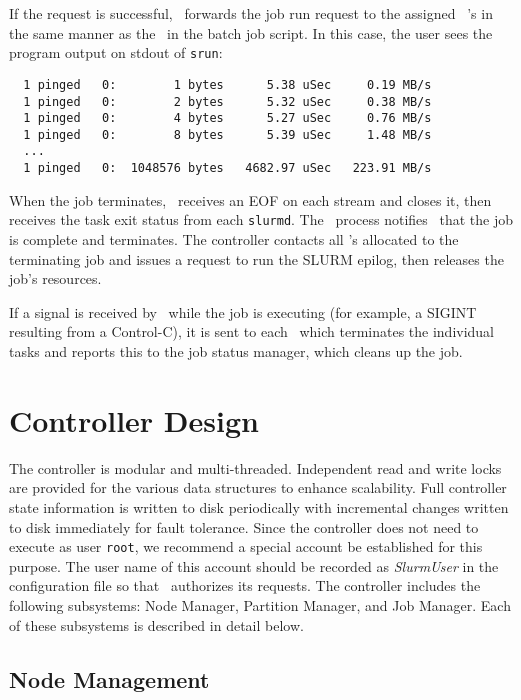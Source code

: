 If the request is successful, \srun\ forwards the job run request
to the assigned \slurmd~'s in the same manner as the \srun\ in the
batch job script. In this case, the user sees the program output on 
stdout of {\tt srun}:

\begin{verbatim}
  1 pinged   0:        1 bytes      5.38 uSec     0.19 MB/s                     
  1 pinged   0:        2 bytes      5.32 uSec     0.38 MB/s                     
  1 pinged   0:        4 bytes      5.27 uSec     0.76 MB/s                     
  1 pinged   0:        8 bytes      5.39 uSec     1.48 MB/s                     
  ...
  1 pinged   0:  1048576 bytes   4682.97 uSec   223.91 MB/s              
\end{verbatim}

When the job terminates, \srun\ receives an EOF on each stream and
closes it, then receives the task exit status from each {\tt slurmd}.
The \srun\ process notifies \slurmctld\ that the job is complete 
and terminates. The controller contacts all \slurmd 's allocated to the
terminating job and issues a request to run the SLURM epilog, then releases
the job's resources.

If a signal is received by \srun\ while the job is executing (for example,
a SIGINT resulting from a Control-C), it is sent to each \slurmd\ which 
terminates the individual tasks and reports this to the job status manager,
which cleans up the job.

\section{Controller Design}

The controller is modular and multi-threaded.  Independent read
and write locks are provided for the various data structures to enhance 
scalability.  Full controller state information is written to 
disk periodically with incremental changes written to disk immediately
for fault tolerance.  
Since the controller does not need to execute as user {\tt root}, 
we recommend a special account be established for this purpose.
The user name of this account should be recorded as {\em SlurmUser} 
in the configuration file so that \slurmd\ authorizes its requests.
The controller includes the following subsystems:
Node Manager, Partition Manager, and Job Manager.
Each of these subsystems is described in detail below.

\subsection{Node Management}

